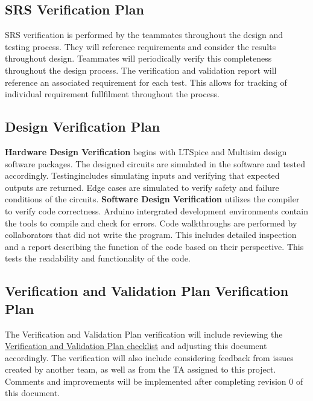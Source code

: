 \documentclass[12pt, titlepage]{article}
\begin{document}
\subsection{SRS Verification Plan}
SRS verification is performed by the teammates throughout the design and testing 
process. They will reference requirements and consider the results throughout design. 
Teammates will periodically verify this completeness throughout the design process. 
The verification and validation report will reference an associated requirement for 
each test. This allows for tracking of individual requirement fullfilment 
throughout the process. 


\subsection{Design Verification Plan}
\textbf{Hardware Design Verification} begins with LTSpice and Multisim design software
packages. The designed circuits are simulated in the software and tested accordingly.
Testingincludes simulating inputs and verifying that expected outputs are returned. 
Edge cases are simulated to verify safety and failure conditions of the circuits. 
\newline
\newline
\textbf{Software Design Verification} utilizes the compiler to verify code correctness. 
Arduino intergrated development environments contain the tools to compile and check for 
errors. Code walkthroughs are performed by collaborators that did not write the program. 
This includes detailed inspection and a report describing the function of the code 
based on their perspective. This tests the readability and functionality of 
the code. 

\subsection{Verification and Validation Plan Verification Plan}

The Verification and Validation Plan verification will include reviewing the \href{file:../Checklists/VnV-Checklist.pdf}{Verification and Validation Plan checklist} and adjusting this document accordingly. The verification will also include considering feedback from issues created by another team, as well as from the TA assigned to this project. Comments and improvements will be implemented after completing revision 0 of this document.
\end{document}
